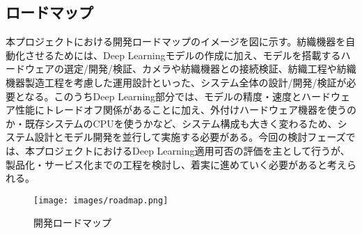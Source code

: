 \subsection{ロードマップ}
本プロジェクトにおける開発ロードマップのイメージを図に示す。紡織機器を自動化させるためには、Deep Learningモデルの作成に加え、モデルを搭載するハードウェアの選定/開発/検証、カメラや紡織機器との接続検証、紡織工程や紡織機器製造工程を考慮した運用設計といった、システム全体の設計/開発/検証が必要となる。このうちDeep Learning部分では、モデルの精度・速度とハードウェア性能にトレードオフ関係があることに加え、外付けハードウェア機器を使うのか・既存システムのCPUを使うかなど、システム構成も大きく変わるため、システム設計とモデル開発を並行して実施する必要がある。今回の検討フェーズでは、本プロジェクトにおけるDeep Learning適用可否の評価を主として行うが、製品化・サービス化までの工程を検討し、着実に進めていく必要があると考えられる。
\\
\begin{figure}[htbp]
  \begin{center}
    \texttt{[image: images/roadmap.png]}
    \caption{開発ロードマップ}
    \label{fig:roadmap}
  \end{center}
\end{figure}